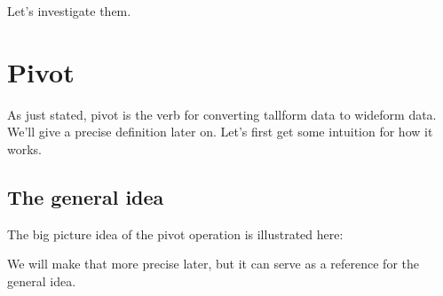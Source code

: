 \documentclass[letterpaper,10pt,english]{sphinxmanual}
\begin{document}
Let’s investigate them.


\section{Pivot}
\label{\detokenize{chapter-6-single-table-verbs:pivot}}
As just stated, pivot is the verb for converting tall\sphinxhyphen{}form data to wide\sphinxhyphen{}form data.  We’ll give a precise definition later on.  Let’s first get some intuition for how it works.


\subsection{The general idea}
\label{\detokenize{chapter-6-single-table-verbs:the-general-idea}}
The big picture idea of the pivot operation is illustrated here:


We will make that more precise later, but it can serve as a reference for the general idea.

 
\end{document}
